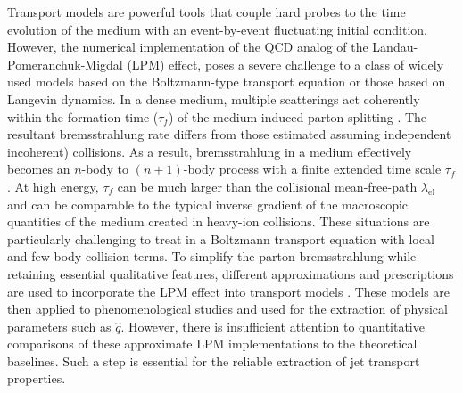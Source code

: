 \documentclass[aps, prc, reprint, amsmath, groupedaddress, nofootinbib]{revtex4-1}
\begin{document}
Transport models are powerful tools that couple hard probes to the time evolution of the medium with an event-by-event fluctuating initial condition. 
However, the numerical implementation of the QCD analog of the Landau-Pomeranchuk-Migdal (LPM) effect, poses a severe challenge to a class of widely used models based on the Boltzmann-type transport equation or those based on Langevin dynamics.
In a dense medium, multiple scatterings act coherently within the formation time ($\tau_f$) of the medium-induced parton splitting \cite{PhysRev.103.1811,Wang:1994fx,Zakharov:1996fv,Zakharov:1997uu,Baier:1996kr,Baier:1996sk}.
The resultant bremsstrahlung rate differs from those estimated assuming independent incoherent) collisions.
As a result, bremsstrahlung in a medium effectively becomes an $n$-body to $(n+1)$-body process with a finite extended time scale $\tau_f$. At high energy, $\tau_f$ can be much larger than the collisional mean-free-path $\lambda_{\textrm{el}}$ and can be comparable to the typical inverse gradient of the macroscopic quantities of the medium created in heavy-ion collisions.
These situations are particularly challenging to treat in a Boltzmann transport equation with local and few-body collision terms. 
To simplify the parton bremsstrahlung while retaining essential qualitative features, different approximations and prescriptions are used to incorporate the LPM effect into transport models \cite{Cao:2013ita,ColemanSmith:2012vr,Xu:2004mz,Zapp:2011ya,Gossiaux:2012cv,Park:thesis}.
These models are then applied to phenomenological studies and used for the extraction of physical parameters such as $\hat{q}$.
However, there is insufficient attention to quantitative comparisons of these approximate LPM implementations to the theoretical baselines.
Such a step is essential for the reliable extraction of jet transport properties.
\end{document}
